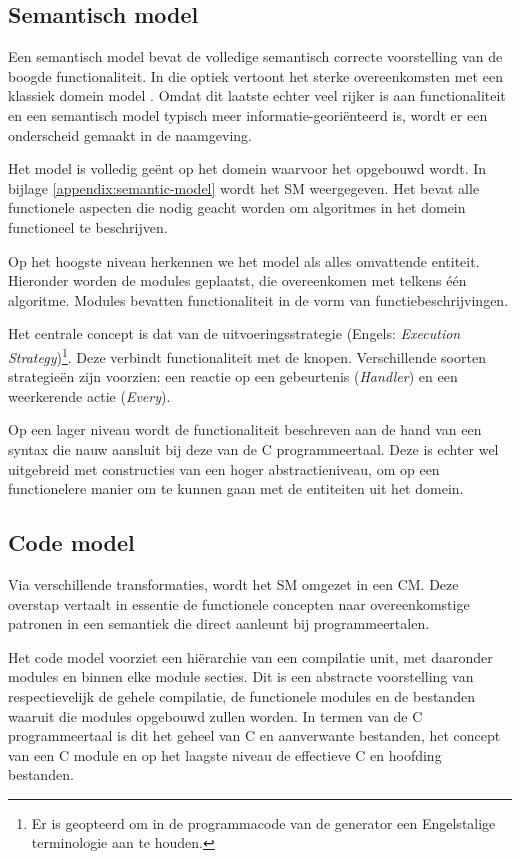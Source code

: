 \subsection{Semantisch model}
\label{subsection:arch-semantic-model}

Een semantisch model bevat de volledige semantisch correcte voorstelling van de
boogde functionaliteit. In die optiek vertoont het sterke overeenkomsten met
een klassiek domein model \citep{fowler2010domain}. Omdat dit laatste echter
veel rijker is aan functionaliteit en een semantisch model typisch meer
informatie-geori\"enteerd is, wordt er een onderscheid gemaakt in de naamgeving.

Het model is volledig ge\"ent op het domein waarvoor het opgebouwd wordt. In
bijlage \ref{appendix:semantic-model} wordt het SM weergegeven. Het bevat alle
functionele aspecten die nodig geacht worden om algoritmes in het domein
functioneel te beschrijven.

Op het hoogste niveau herkennen we het model als alles omvattende entiteit.
Hieronder worden de modules geplaatst, die overeenkomen met telkens \'e\'en
algoritme. Modules bevatten functionaliteit in de vorm van
functiebeschrijvingen.

Het centrale concept is dat van de uitvoeringsstrategie (Engels:
\emph{Execution Strategy})\footnote{Er is geopteerd om in de programmacode van
de generator een Engelstalige terminologie aan te houden.}. Deze verbindt
functionaliteit met de knopen. Verschillende soorten strategie\"en zijn
voorzien: een reactie op een gebeurtenis (\emph{Handler}) en een weerkerende
actie (\emph{Every}).

Op een lager niveau wordt de functionaliteit beschreven aan de hand van een
syntax die nauw aansluit bij deze van de C programmeertaal. Deze is echter wel
uitgebreid met constructies van een hoger abstractieniveau, om op een
functionelere manier om te kunnen gaan met de entiteiten uit het domein.

\subsection{Code model}
\label{subsection:arch-code-model}

Via verschillende transformaties, wordt het SM omgezet in een CM. Deze overstap
vertaalt in essentie de functionele concepten naar overeenkomstige patronen in
een semantiek die direct aanleunt bij programmeertalen.

Het code model voorziet een hi\"erarchie van een compilatie unit, met daaronder
modules en binnen elke module secties. Dit is een abstracte voorstelling van
respectievelijk de gehele compilatie, de functionele modules en de bestanden
waaruit die modules opgebouwd zullen worden. In termen van de C programmeertaal
is dit het geheel van C en aanverwante bestanden, het concept van een C module
en op het laagste niveau de effectieve C en hoofding bestanden.

